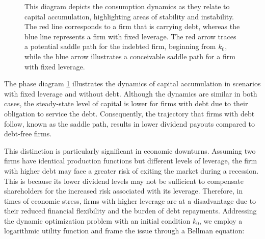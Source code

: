 \documentclass[12pt]{article}
\begin{document}
\begin{figure}
    \caption{This diagram depicts the consumption dynamics as they relate to capital accumulation, highlighting areas of
    stability and instability. The red line corresponds to a firm that is carrying debt, whereas the blue line
    represents a firm with fixed leverage. The red arrow traces a potential saddle path for the indebted firm, beginning
    from \( k_0 \), while
     the blue arrow illustrates a conceivable saddle path for a firm with fixed leverage.} 
    \label{pl_phase_b}
\end{figure}
The phase diagram \ref{pl_phase_b} illustrates the dynamics of capital accumulation in scenarios with
fixed leverage and without debt. Although the dynamics are similar in both cases, the steady-state level of capital is
lower for firms with debt due to their obligation to service the debt. Consequently, the trajectory that firms with debt
follow, known as the saddle path, results in lower dividend payouts compared to debt-free firms. 

This distinction is particularly significant in economic downturns. Assuming two firms have identical production
functions but different levels of leverage, the firm with higher debt may face a greater risk of exiting the market
during a recession. This is because its lower dividend levels may not be sufficient to compensate shareholders for the
increased risk associated with its leverage. Therefore, in times of economic stress, firms with higher leverage are at a
disadvantage due to their reduced financial flexibility and the burden of debt repayments. 
Addressing the dynamic optimization problem with an initial condition \(k_0\), we employ a logarithmic utility function
and frame the issue through a Bellman equation:
\end{document}
